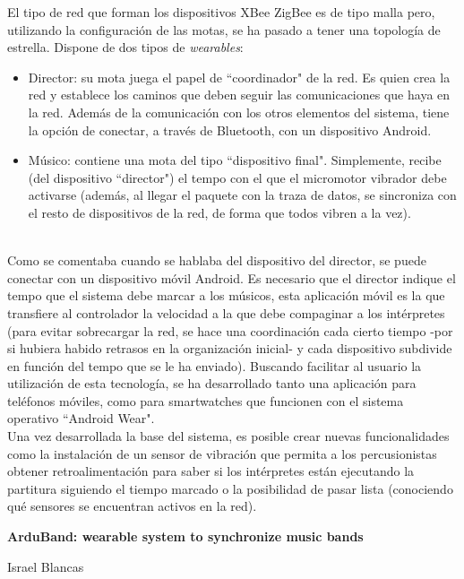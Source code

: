 El tipo de red que forman los dispositivos XBee ZigBee es de tipo malla pero, utilizando la configuración
de las motas, se ha pasado a tener una topología de estrella. Dispone de dos tipos de  \textit{wearables}:
  \begin{itemize}
  \item Director: su mota juega el papel de ``coordinador" de la red. Es quien crea la red y establece los caminos que deben seguir las comunicaciones que haya en la red. Además de la comunicación con los otros elementos del sistema, tiene la opción de conectar, a través de Bluetooth, con un dispositivo Android.
  \item Músico: contiene una mota del tipo ``dispositivo final". Simplemente, recibe (del dispositivo ``director") el tempo con el que el micromotor vibrador debe activarse (además, al llegar el paquete con la traza de datos, se sincroniza con el resto de dispositivos de la red, de forma que todos vibren a la vez).
  \end{itemize}

\\
Como se comentaba cuando se hablaba del dispositivo del director, se puede conectar
con un dispositivo móvil Android. Es necesario que el director indique el tempo que el
sistema debe marcar a los músicos, esta aplicación móvil es la que transfiere al controlador la
velocidad a la que debe compaginar a los intérpretes (para evitar sobrecargar la red, se hace una
coordinación cada cierto tiempo -por si hubiera habido retrasos en la organización inicial- y cada
dispositivo subdivide en función del tempo que se le ha enviado). Buscando facilitar al usuario la utilización
de esta tecnología, se ha desarrollado tanto una aplicación para teléfonos móviles, como para smartwatches
que funcionen con el sistema operativo ``Android Wear".\\

Una vez desarrollada la base del sistema, es posible crear nuevas funcionalidades como la instalación de un
sensor de vibración que permita a los percusionistas obtener retroalimentación para saber si los intérpretes
están ejecutando la partitura siguiendo el tiempo marcado o la posibilidad de pasar lista (conociendo qué sensores
se encuentran activos en la red).\\

\cleardoublepage


\thispagestyle{empty}


\begin{center}
{\large\bfseries ArduBand: wearable system to synchronize music bands}\\
\end{center}
\begin{center}
Israel Blancas\\
\end{center}

